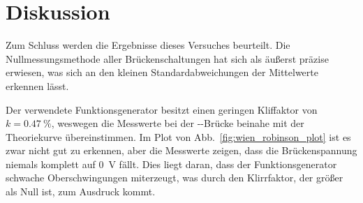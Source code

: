 
\section{Diskussion}
Zum Schluss werden die Ergebnisse dieses Versuches beurteilt.  Die
Nullmessungsmethode aller Brückenschaltungen hat sich als äußerst
präzise erwiesen, was sich an den kleinen Standardabweichungen der
Mittelwerte erkennen lässt.

Der verwendete Funktionsgenerator besitzt einen geringen Kliffaktor von
$k = \SI{0.47}{\percent}$, weswegen die Messwerte bei der
--Brücke beinahe mit der Theoriekurve
übereinstimmen. Im Plot von Abb.~\ref{fig:wien_robinson_plot} ist es
zwar nicht gut zu erkennen, aber die Messwerte zeigen, dass die
Brückenspannung niemals komplett auf \SI{0}{\volt} fällt. Dies liegt
daran, dass der Funktionsgenerator schwache Oberschwingungen miterzeugt,
was durch den Klirrfaktor, der größer als Null ist, zum Ausdruck kommt.
